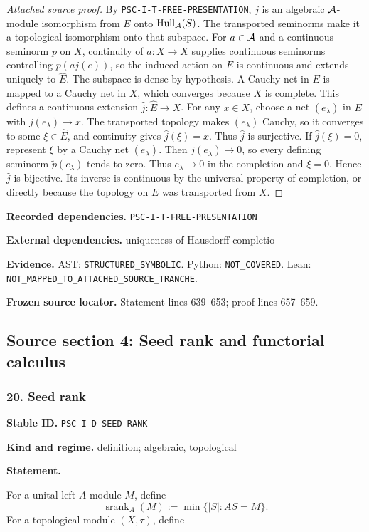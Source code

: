 \documentclass[a4paper,11pt]{article}
\newcommand{\Hull}{\operatorname{Hull}}\newcommand{\srank}{\operatorname{srank}}\newcommand{\psrank}{\operatorname{psrank}}\newcommand{\End}{\operatorname{End}}\newcommand{\Hom}{\operatorname{Hom}}\newcommand{\im}{\operatorname{im}}\newcommand{\Ker}{\operatorname{Ker}}\newcommand{\Jac}{\operatorname{Jac}}\newcommand{\Irr}{\operatorname{Irr}}\newcommand{\Span}{\operatorname{span}}\newcommand{\alg}{\operatorname{alg}}\newcommand{\Reach}{\operatorname{Reach}}\newcommand{\Supp}{\operatorname{Supp}}\newcommand{\id}{\mathrm{id}}\newcommand{\cl}[1]{\overline{#1}}
\newcommand{\field}[2]{\noindent\textbf{#1.} #2\par}
\begin{document}
\begin{proof}[Attached source proof]
By \hyperref[rec:PSC-I-T-FREE-PRESENTATION]{\nolinkurl{PSC-I-T-FREE-PRESENTATION}}, $j$ is an algebraic $\mathcal A$-module isomorphism from $E$ onto $\Hull_{\A}(S)$.  The transported seminorms make it a topological isomorphism onto that subspace.  For $a\in\mathcal A$ and a continuous seminorm $p$ on $X$, continuity of $a:X\to X$ supplies continuous seminorms controlling $p(aj(e))$, so the induced action on $E$ is continuous and extends uniquely to $\widehat E$.  The subspace is dense by hypothesis.  A Cauchy net in $E$ is mapped to a Cauchy net in $X$, which converges because $X$ is complete.  This defines a continuous extension $\widehat j:\widehat E\to X$.  For any $x\in X$, choose a net $(e_\lambda)$ in $E$ with $j(e_\lambda)\to x$.  The transported topology makes $(e_\lambda)$ Cauchy, so it converges to some $\xi\in\widehat E$, and continuity gives $\widehat j(\xi)=x$.  Thus $\widehat j$ is surjective.  If $\widehat j(\xi)=0$, represent $\xi$ by a Cauchy net $(e_\lambda)$.  Then $j(e_\lambda)\to0$, so every defining seminorm $\widetilde p(e_\lambda)$ tends to zero.  Thus $e_\lambda\to0$ in the completion and $\xi=0$.  Hence $\widehat j$ is bijective.  Its inverse is continuous by the universal property of completion, or directly because the topology on $E$ was transported from $X$.
\end{proof}
\field{Recorded dependencies}{\hyperref[rec:PSC-I-T-FREE-PRESENTATION]{\nolinkurl{PSC-I-T-FREE-PRESENTATION}}}
\field{External dependencies}{uniqueness of Hausdorff completio}
\field{Evidence}{AST: \nolinkurl{STRUCTURED_SYMBOLIC}. Python: \nolinkurl{NOT_COVERED}. Lean: \nolinkurl{NOT_MAPPED_TO_ATTACHED_SOURCE_TRANCHE}.}
\field{Frozen source locator}{Statement lines 639--653; proof lines 657--659.}
\clearpage\subsection{Source section 4: Seed rank and functorial calculus}
\subsubsection*{20. Seed rank}
\label{rec:PSC-I-D-SEED-RANK}
\field{Stable ID}{\nolinkurl{PSC-I-D-SEED-RANK}}
\field{Kind and regime}{definition; algebraic, topological}
\textbf{Statement.}\par
For a unital left $A$-module $M$, define
\[
\srank_A(M):=\min\{|S|:AS=M\}.
\]
For a topological module $(X,\tau)$, define
\end{document}
